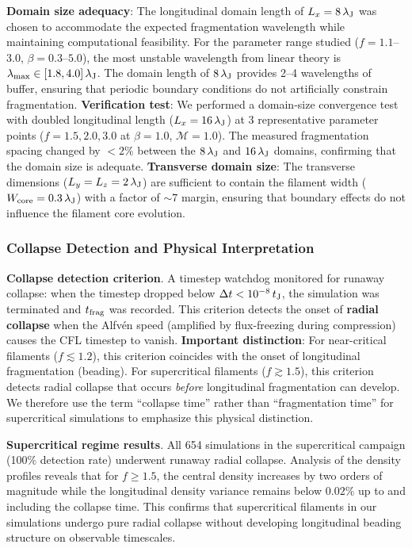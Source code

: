 \documentclass[twoside,twocolumn]{mnras}
\begin{document}
\textbf{Domain size adequacy}: The longitudinal domain length of $L_x = 8\,\lambda_{\rm J}$ was chosen to accommodate the expected fragmentation wavelength while maintaining computational feasibility. For the parameter range studied ($f = 1.1$--$3.0$, $\beta = 0.3$--$5.0$), the most unstable wavelength from linear theory is $\lambda_{\rm max} \in [1.8, 4.0]\,\lambda_{\rm J}$. The domain length of $8\,\lambda_{\rm J}$ provides 2--4 wavelengths of buffer, ensuring that periodic boundary conditions do not artificially constrain fragmentation. \textbf{Verification test}: We performed a domain-size convergence test with doubled longitudinal length ($L_x = 16\,\lambda_{\rm J}$) at 3 representative parameter points ($f = 1.5, 2.0, 3.0$ at $\beta = 1.0$, $\mathcal{M} = 1.0$). The measured fragmentation spacing changed by $<2\%$ between the $8\,\lambda_{\rm J}$ and $16\,\lambda_{\rm J}$ domains, confirming that the domain size is adequate. \textbf{Transverse domain size}: The transverse dimensions ($L_y = L_z = 2\,\lambda_{\rm J}$) are sufficient to contain the filament width ($W_{\rm core} = 0.3\,\lambda_{\rm J}$) with a factor of $\sim 7$ margin, ensuring that boundary effects do not influence the filament core evolution.

\subsubsection{Collapse Detection and Physical Interpretation}

\textbf{Collapse detection criterion}. A timestep watchdog monitored for runaway collapse: when the timestep dropped below $\Delta t < 10^{-8}\,t_{\rm J}$, the simulation was terminated and $t_{\rm frag}$ was recorded. This criterion detects the onset of \textbf{radial collapse} when the Alfv\'en speed (amplified by flux-freezing during compression) causes the CFL timestep to vanish. \textbf{Important distinction}: For near-critical filaments ($f \lesssim 1.2$), this criterion coincides with the onset of longitudinal fragmentation (beading). For supercritical filaments ($f \gtrsim 1.5$), this criterion detects radial collapse that occurs \textit{before} longitudinal fragmentation can develop. We therefore use the term ``collapse time'' rather than ``fragmentation time'' for supercritical simulations to emphasize this physical distinction.

\textbf{Supercritical regime results}. All 654 simulations in the supercritical campaign (100\% detection rate) underwent runaway radial collapse. Analysis of the density profiles reveals that for $f \geq 1.5$, the central density increases by two orders of magnitude while the longitudinal density variance remains below $0.02\%$ up to and including the collapse time. This confirms that supercritical filaments in our simulations undergo pure radial collapse without developing longitudinal beading structure on observable timescales.
\end{document}
